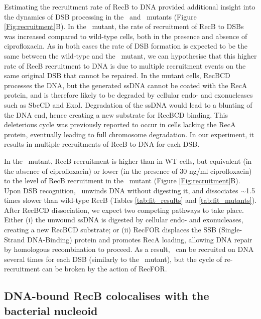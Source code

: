 Estimating the recruitment rate of RecB to DNA provided additional insight into the dynamics of DSB processing in the \dreca\ and \geneteneighty\ mutants (Figure \ref{Fig:recruitment}B). In the \dreca\ mutant, the rate of recruitment of RecB to DSBs was increased compared to wild-type cells, both in the presence and absence of ciprofloxacin. As in both cases the rate of DSB formation is expected to be the same between the wild-type and the \dreca\ mutant, we can hypothesise that this higher rate of RecB recruitment to DNA is due to multiple recruitment events on the same original DSB that cannot be repaired. In the mutant cells, RecBCD processes the DNA, but the generated ssDNA cannot be coated with the RecA protein, and is therefore likely to be degraded by cellular endo- and exonucleases such as SbcCD and ExoI\cite{Zahradka2009}. Degradation of the ssDNA would lead to a blunting of the DNA end, hence creating a new substrate for RecBCD binding. This deleterious cycle was previously reported to occur in cells lacking the RecA protein, eventually leading to full chromosome degradation\cite{Capaldo1975,Skarstad1993}. In our experiment, it results in multiple recruitments of RecB to DNA for each DSB.

In the \geneteneighty\ mutant, RecB recruitment is higher than in WT cells, but equivalent (in the absence of ciprofloxacin) or lower (in the presence of 30 ng/ml ciprofloxacin) to the level of RecB recruitment in the \dreca\ mutant (Figure \ref{Fig:recruitment}B). Upon DSB recognition, \teneighty\ unwinds DNA without digesting it, and dissociates $\sim$1.5 times slower than wild-type RecB (Tables \ref{tab:fit_results} and \ref{tab:fit_mutants}). After RecBCD dissociation, we expect two competing pathways to take place. Either (i) the unwound ssDNA is digested by cellular endo- and exonucleases, creating a new RecBCD substrate; or (ii) RecFOR displaces the SSB (Single-Strand DNA-Binding) protein and promotes RecA loading, allowing DNA repair by homologous recombination to proceed\cite{Ivancic-Bace_2003}. As a result, \teneighty\ can be recruited on DNA several times for each DSB (similarly to the \dreca\ mutant), but the cycle of re-recruitment can be broken by the action of RecFOR.


\subsection*{DNA-bound RecB colocalises with the bacterial nucleoid}

